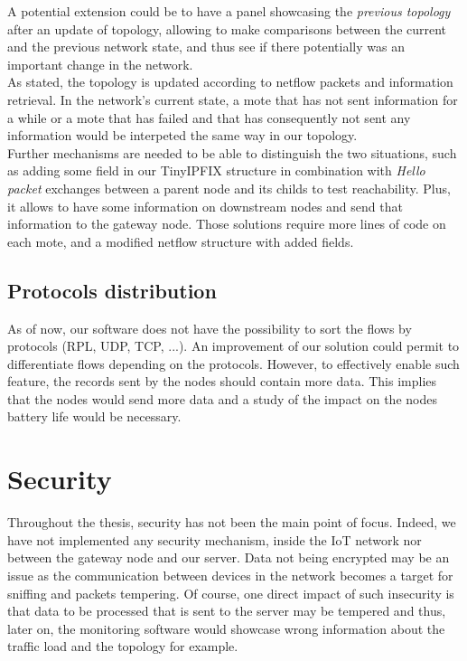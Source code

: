 A potential extension could be to have a panel showcasing the \textit{previous topology} after an update of topology, allowing to make comparisons between the current and the previous network state, and thus see if there potentially was an important change in the network.\\

As stated, the topology is updated according to netflow packets and information retrieval. In the network's current state, a mote that has not sent information for a while or a mote that has failed and that has consequently not sent any information would be interpeted the same way in our topology. \\

Further mechanisms are needed to be able to distinguish the two situations, such as adding some field in our TinyIPFIX structure in combination with \textit{Hello packet} exchanges between a parent node and its childs to test reachability. Plus, it allows to have some information on downstream nodes and send that information to the gateway node. Those solutions require more lines of code on each mote, and a modified netflow structure with added fields.



\subsection{Protocols distribution}

As of now, our software does not have the possibility to sort the flows by protocols (RPL, UDP, TCP, ...). An improvement of our solution could permit to differentiate flows depending on the protocols. However, to effectively enable such feature, the records sent by the nodes should contain more data. This implies that the nodes would send more data and a study of the impact on the nodes battery life would be necessary.

\section{Security}

Throughout the thesis, security has not been the main point of focus. Indeed, we have not implemented any security mechanism, inside the IoT network nor between the gateway node and our server. Data not being encrypted may be an issue as the communication between devices in the network becomes a target for sniffing and packets tempering. Of course, one direct impact of such insecurity is that data to be processed that is sent to the server may be tempered and thus, later on, the monitoring software would showcase wrong information about the traffic load and the topology for example.\\

